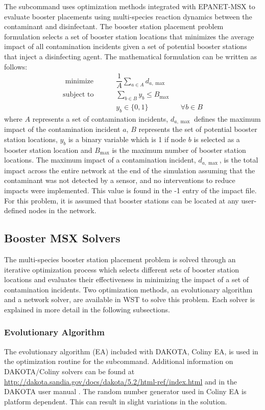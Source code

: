 The  subcommand uses optimization methods integrated 
with EPANET-MSX to evaluate booster placements using multi-species reaction dynamics between 
the contaminant and disinfectant. The booster station placement problem formulation 
selects a set of booster station locations that minimizes the average impact 
of all contamination incidents given a set of potential booster stations that 
inject a disinfecting agent. The mathematical formulation can be written as follows:
\begin{align}
\textrm{  minimize } \qquad & \dfrac{1}{A} \sum_{a \in {A}}d_{a,\max} \label{eqn:booster_msx} \\
\textrm{subject~to } \qquad &\sum_{b\in B}y_{b} \leq B_{\max} \label{eq:booster_msx_2} \\
&y_{b} \in \{0,1\} &&\forall b\in B \label{eq:booster_msx_3}
\end{align}
where ${A}$ represents a set of contamination incidents, 
$d_{a,\max}$ defines the maximum impact of the contamination incident $a$, 
$B$ represents the set of potential booster station locations,
$y_b$ is a binary variable which is 1 if node $b$ is selected as a booster station location 
and $B_{\max}$ is the maximum number of booster station locations. 
The maximum impact of a contamination incident, $d_{a,\max}$, is the total impact 
across the entire network at the end of the simulation assuming that the 
contaminant was not detected by a sensor, and no interventions to reduce 
impacts were implemented. This value is found in the -1 entry of the impact file. 
For this problem, it is assumed that booster stations can be located at any 
user-defined nodes in the network.

\subsection{Booster MSX Solvers}
The multi-species booster station placement problem is solved through an iterative optimization process which 
selects different sets of booster station locations and evaluates their effectiveness
in minimizing the impact of a set of contamination incidents. Two optimization 
methods, an evolutionary algorithm and a network solver, are available in WST to solve this problem. 
Each solver is explained in more detail in the following subsections. 

\subsubsection{Evolutionary Algorithm}\label{boostermsx_coliny_ea}
The evolutionary algorithm (EA) included with DAKOTA, Coliny EA, is used in the 
optimization routine for the  subcommand. 
Additional information on DAKOTA/Coliny solvers can be found at 
\url{http://dakota.sandia.gov/docs/dakota/5.2/html-ref/index.html}
and in the DAKOTA user manual \citep{DakotaUserManual}.
The random number generator used in Coliny EA is platform dependent.  
This can result in slight variations in the solution.

